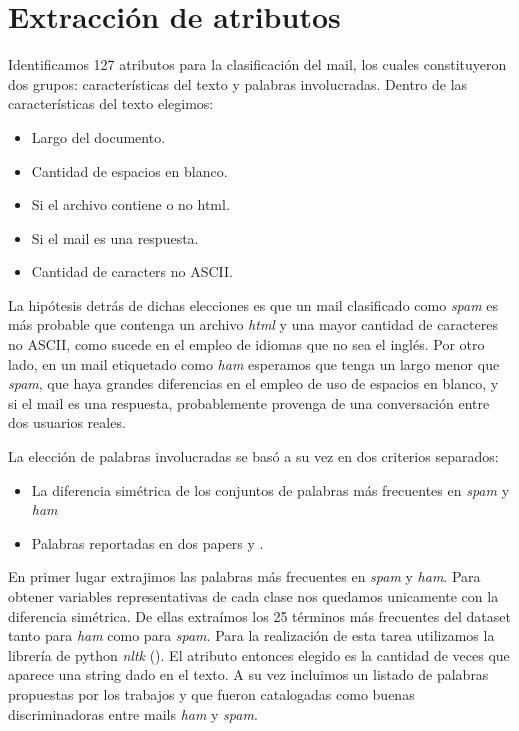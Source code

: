 \documentclass[a4paper,10pt]{article}
\begin{document}
\section{Extracci\'on de atributos} \label{sec:extraccion}

\par Identificamos 127 atributos para la clasificación del mail, los cuales constituyeron dos grupos: características del texto y palabras involucradas. Dentro de las características del texto elegimos:
\begin{itemize}
\item Largo del documento.
\item Cantidad de espacios en blanco.
\item Si el archivo contiene o no html.
\item Si el mail es una respuesta.
\item Cantidad de caracters no ASCII.
\end{itemize}

La hipótesis detrás de dichas elecciones es que un mail clasificado como \emph{spam} es más probable que contenga un archivo \emph{html} y una mayor cantidad de caracteres no ASCII, como sucede en el empleo de idiomas que no sea el inglés. Por otro lado, en un mail etiquetado como \emph{ham} esperamos que tenga un largo menor que \emph{spam}, que haya grandes diferencias en el empleo de uso de espacios en blanco, y si el mail es una respuesta, probablemente provenga de una conversación entre dos usuarios reales.

\par La elección de palabras involucradas se basó a su vez en dos criterios separados: 
\begin{itemize}
 \item La diferencia sim\'etrica de los conjuntos de palabras m\'as frecuentes en \emph{spam} y \emph{ham}
\item Palabras reportadas en dos papers \cite{Gunal} y \cite{Vaughan}. 
\end{itemize}

En primer lugar extrajimos las palabras m\'as frecuentes en \emph{spam} y \emph{ham}. Para obtener variables representativas de cada clase nos quedamos unicamente con la diferencia sim\'etrica. De ellas extraímos los 25 términos más frecuentes del dataset tanto para \emph{ham} como para \emph{spam}. Para la realización de esta tarea utilizamos la librería de python \emph{nltk} (\cite{nltk}). El atributo entonces elegido es la cantidad de veces que aparece una string dado en el texto. 
A su vez incluimos un listado de palabras propuestas por los trabajos \cite{Gunal} y \cite{Vaughan} que fueron catalogadas como buenas discriminadoras entre mails \emph{ham} y \emph{spam}. 
\end{document}
